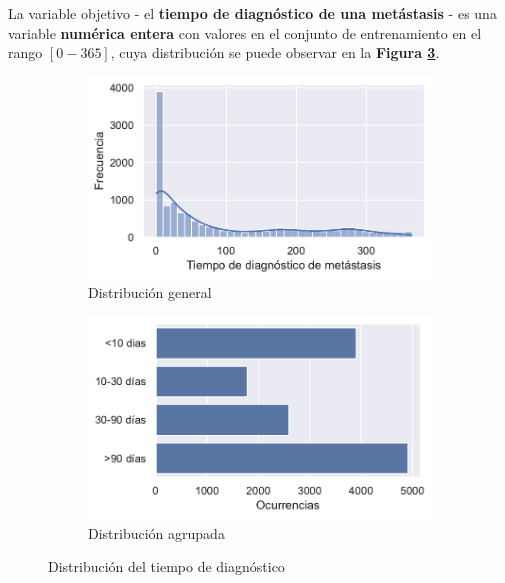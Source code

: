 La variable objetivo - el \textbf{tiempo de diagnóstico de una metástasis} - es una variable \textbf{numérica entera} con valores en el conjunto de entrenamiento en el rango $[0-365]$, cuya distribución se puede observar en la \textbf{Figura \ref{fig:ch3varobjetivo}}.

\begin{figure}[h]
	\begin{center}
		\begin{subfigure}{0.45\linewidth}
			\begin{center}
				\includegraphics[width=\linewidth]{figs/chapter3/objectivevariable/diagnosisperioddistribution.pdf}
				\caption{Distribución general}\label{fig:ch3general}
			\end{center}
		\end{subfigure} 
		\begin{subfigure}{0.45\linewidth}
			\begin{center}
				\includegraphics[width=\linewidth]{figs/chapter3/objectivevariable/diagnosisperiodgrouped.pdf}
				\caption{Distribución agrupada}\label{fig:ch3group}
			\end{center}
		\end{subfigure} 
	\end{center}
	\captionsetup{aboveskip=-5pt, belowskip=-15pt}
	\caption{Distribución del tiempo de diagnóstico}
	\label{fig:ch3varobjetivo}
\end{figure}

